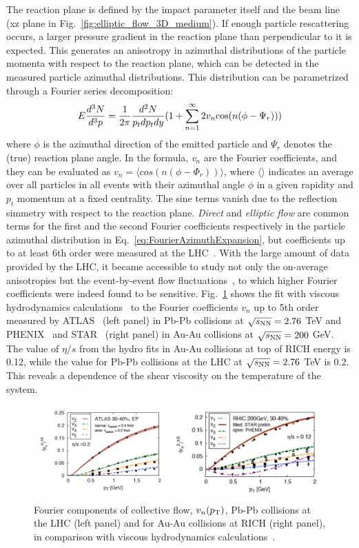 The reaction plane is defined by the impact parameter itself and the beam line (xz plane in Fig.~\ref{fig:elliptic_flow_3D_medium}). If enough particle rescattering occurs, a larger pressure gradient in the reaction plane than perpendicular to it is expected. This generates an anisotropy in azimuthal distributions of the particle momenta with respect to the reaction plane, which can be detected in the measured particle azimuthal distributions. This distribution can be parametrized through a Fourier series decomposition:
\begin{equation}
\label{eq:FourierAzimuthExpansion}
E \frac{d^3N}{d^3p} = \frac{1}{2\pi} \frac{d^2N}{p_t dp_t dy} (1 + \sum_{n=1}^\infty 2v_n {\rm cos} (n(\phi - \Psi_r)))
\end{equation}
where $\phi$ is the azimuthal direction of the emitted particle and $\Psi_r$ denotes the (true) reaction plane angle.
In the formula, {\it v$_n$} are the Fourier coefficients, and they can be evaluated as $v_n = \langle cos(n(\phi - \Phi_r)) \rangle$, where $\langle \rangle$ indicates an average over all particles in all events with their azimuthal angle $\phi$ in a given rapidity and $p_t$ momentum at a fixed centrality. The sine terms vanish due to the reflection simmetry with respect to the reaction plane. {\it Direct} and {\it elliptic flow} are common terms for the first and the
second Fourier coefficients respectively in the particle azimuthal distribution in Eq.~\ref{eq:FourierAzimuthExpansion}, but coefficients up to at least 6th order were measured at the LHC~\cite{ATLAS:2012at}. With the large amount of data provided by the LHC, it became accessible to study not only the on-average anisotropies but the event-by-event flow fluctuations~\cite{Aad:2013xma,Schukraft:2012ah}, to which higher Fourier coefficients were indeed found to be sensitive. Fig.~\ref{fig:vnHydro} shows the fit with viscous hydrodynamics calculations~\cite{Gale:2012rq} to the Fourier coefficients $v_n$ up to 5th order measured by ATLAS~\cite{ATLAS:2012at} (left panel) in Pb-Pb collisions at $\sqrt{s_{\rm NN}} = 2.76$ TeV and PHENIX~\cite{Adare:2011tg} and STAR~\cite{Pandit:2012mq} (right panel) in Au-Au collisions at $\sqrt{s_{\rm NN}} = 200 $ GeV. The value of $\eta/s$ from the hydro fits in Au-Au collisions at top of RICH energy is 0.12, while the value for Pb-Pb collisions at the LHC at $\sqrt{s_{\rm NN}} = 2.76$ TeV is 0.2. This reveals a dependence of the shear viscosity on the temperature of the system.
\begin{figure}[!ht]
  \centering
  \includegraphics[width=15cm]{FigCap1/RICH_ATLAS_vn.png}
  \caption{Fourier components of collective flow, $v_n(p_{\rm T})$, Pb-Pb collisions at the LHC (left panel) and for Au-Au collisions at RICH (right panel), in comparison with viscous hydrodynamics calculations~\cite{Gale:2012rq}.}
  \label{fig:vnHydro}
\end{figure}
